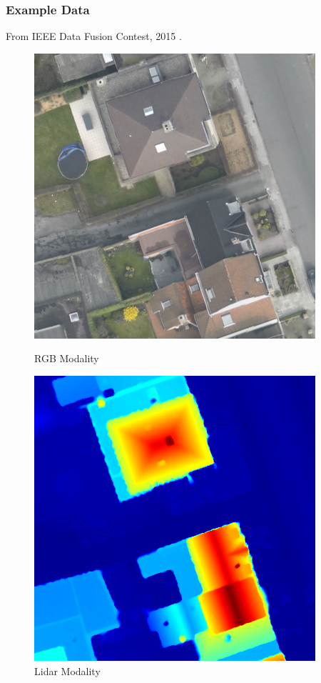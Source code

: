 \documentclass{beamer}
\begin{document}
\begin{frame}
  \frametitle{Example Data}
  From IEEE Data Fusion Contest, 2015 \cite{DFC2015}.
  \begin{figure}[ht]
    \begin{minipage}[b]{0.45\linewidth}
      \centering
      \includegraphics[width=\textwidth]{./Images/DFC2015/optical.png}
      \caption{RGB Modality}
    \end{minipage}
    \begin{minipage}[b]{0.45\linewidth}
      \centering
      \includegraphics[width=\textwidth]{./Images/DFC2015/lidarColor.png}
      \caption{Lidar Modality}
    \end{minipage}
  \end{figure}
\end{frame}
\end{document}
